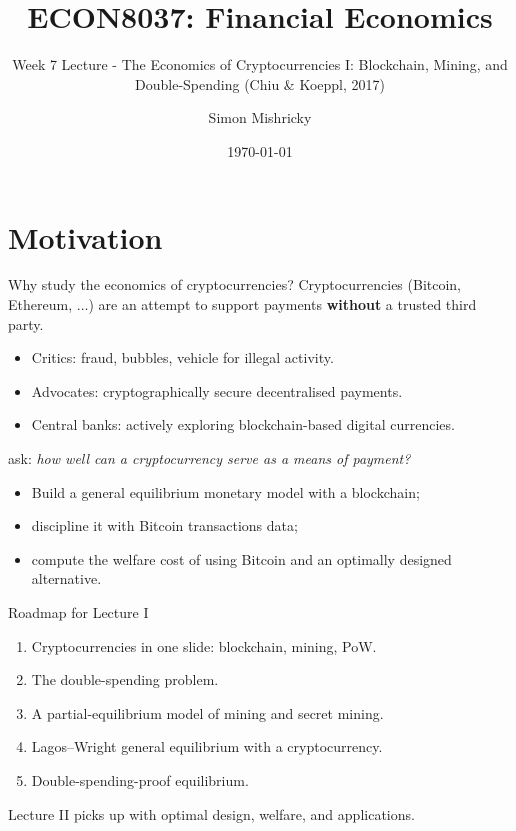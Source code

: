 \documentclass[aspectratio=169,xcolor=dvipsnames]{beamer}
\title{ECON8037: Financial Economics}
\subtitle{\normalsize Week 7 Lecture - The Economics of Cryptocurrencies I: Blockchain, Mining, and Double-Spending (Chiu \& Koeppl, 2017)}
\author{Simon Mishricky}
\institute{Research School of Economics, Australian National University}
\date{\today}
\begin{document}
\section{Motivation}
\frame{\titlepage}

\begin{frame}{Why study the economics of cryptocurrencies?}
    Cryptocurrencies (Bitcoin, Ethereum, $\ldots$) are an attempt to support payments
    \textbf{without} a trusted third party.
    \vspace{2mm}
    \begin{itemize}
        \item Critics: fraud, bubbles, vehicle for illegal activity.
        \item Advocates: cryptographically secure decentralised payments.
        \item Central banks: actively exploring blockchain-based digital currencies.
    \end{itemize}
    \vspace{2mm}
    \citet{chiu2017} ask: \emph{how well can a cryptocurrency serve as a means of payment?}
    \vspace{2mm}
    \begin{itemize}
        \item Build a general equilibrium monetary model with a blockchain;
        \item discipline it with Bitcoin transactions data;
        \item compute the welfare cost of using Bitcoin and an optimally designed alternative.
    \end{itemize}
\end{frame}

\begin{frame}{Roadmap for Lecture I}
    \begin{enumerate}
        \item Cryptocurrencies in one slide: blockchain, mining, PoW.
        \item The double-spending problem.
        \item A partial-equilibrium model of mining and secret mining.
        \item Lagos--Wright general equilibrium with a cryptocurrency.
        \item Double-spending-proof equilibrium.
    \end{enumerate}
    \vspace{4mm}
    Lecture II picks up with optimal design, welfare, and applications.
\end{frame}
\end{document}
